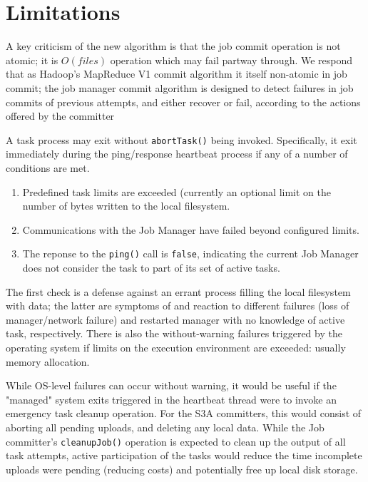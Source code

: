\documentclass[conference]{IEEEtran}
\begin{document}

\section{Limitations}
\label{sec:limitations}

A key criticism of the new algorithm is that the job commit operation is not atomic;
it is $O(files)$ operation which may fail partway through.
We respond that as Hadoop's MapReduce V1 commit algorithm it itself non-atomic in job commit;
the job manager commit algorithm is designed to detect failures in job commits
of previous attempts, and either recover or fail, according to the actions
offered by the committer

A task process may exit without \texttt{abortTask()} being invoked.
Specifically, it exit immediately during the ping/response
heartbeat process if any of a number of conditions are met.

\begin{enumerate}
  \item Predefined task limits are exceeded
  (currently an optional limit on the number of bytes written to the local filesystem.
  \item Communications with the Job Manager have failed beyond configured limits.
  \item The reponse to the \texttt{ping()} call is \texttt{false}, indicating the current
  Job Manager does not consider the task to part of its set of active tasks.
\end{enumerate}

The first check is a defense against an errant process filling the local
filesystem with data;
the latter are symptoms of and reaction to different failures (loss of manager/network failure)
and restarted manager with no knowledge of active task, respectively.
There is also the without-warning failures triggered by the operating system
if limits on the execution environment are exceeded: usually memory allocation.

While OS-level failures can occur without warning, it would be useful if the
"managed" system exits triggered in the heartbeat thread were to invoke
an emergency task cleanup operation.
For the S3A committers, this would consist of aborting all pending uploads, and
deleting any local data.
While the Job committer's \texttt{cleanupJob()} operation is expected to clean up
the output of all task attempts, active participation of the tasks would
reduce the time incomplete uploads were pending (reducing costs) and
potentially free up local disk storage.
\end{document}
